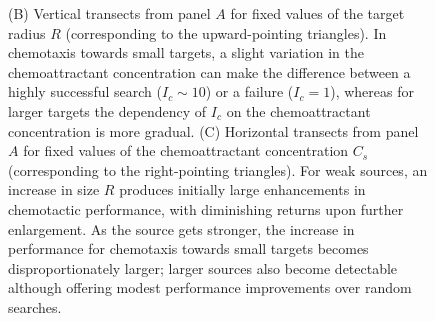 \documentclass[9pt,twocolumn,twoside]{pnas-new}
\begin{document}
\begin{figure}
{        (B) Vertical transects from panel $A$ for fixed values of the target radius $R$ (corresponding to the upward-pointing triangles).
        In chemotaxis towards small targets, a slight variation in the chemoattractant concentration can make the difference between a highly successful search ($I_c\sim10$) or a failure ($I_c=1$), whereas for larger targets the dependency of $I_c$ on the chemoattractant concentration is more gradual.
        (C) Horizontal transects from panel $A$ for fixed values of the chemoattractant concentration $C_s$ (corresponding to the right-pointing triangles).
        For weak sources, an increase in size $R$ produces initially large enhancements in chemotactic performance, with diminishing returns upon further enlargement.
        As the source gets stronger, the increase in performance for chemotaxis towards small targets becomes disproportionately larger; larger sources also become detectable although offering modest performance improvements over random searches.
    }
    \label{fig:asymmetric-performance}
\end{figure}
\end{document}
